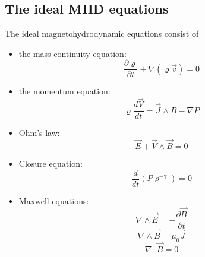 \subsection{The ideal MHD equations}
The ideal magnetohydrodynamic equations consist of
\begin{itemize}
    \item the mass-continuity equation:
            \begin{equation}
                \frac{\partial\varrho}{\partial t} + \nabla(\varrho \vec{v}) = 0
            \end{equation}
    \item the momentum equation:
            \begin{equation}
                \varrho \frac{d \vec{V}}{dt} = \vec{J} \wedge B - \nabla P
            \end{equation}
    \item Ohm's law:
            \begin{equation}
                \vec{E} + \vec{V} \wedge \vec{B} = 0
            \end{equation}
    \item Closure equation:
            \begin{equation}
                \frac{d}{dt}\left(P \varrho^{-\gamma}\right) = 0
            \end{equation}
    \item Maxwell equations:
            \begin{equation}
                \nabla\wedge\vec{E} = - \frac{\partial \vec{B}}{\partial t}
            \end{equation}
            \begin{equation}
                \nabla\wedge\vec{B} =  \mu_0 \vec{J}
            \end{equation}
            \begin{equation}
                \nabla\cdot\vec{B} = 0
            \end{equation}
\end{itemize}